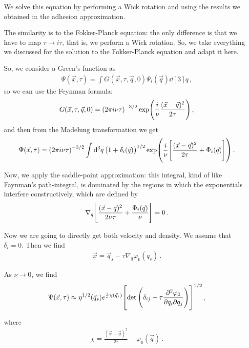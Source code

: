 \documentclass[main.tex]{subfiles}
\begin{document}
We solve this equation by performing a Wick rotation and using the results we obtained in the adhesion approximation. 

The similarity is to the Fokker-Planck equation: the only difference is that we have to map \(\tau \to i \tau \), that is, we perform a Wick rotation. 
So, we take everything we discussed for the solution to the Fokker-Planck equation and adapt it here. 

So, we consider a Green's function as 
%
\begin{align}
\Psi (\vec{x}, \tau ) = \int G(\vec{x}, \tau, \vec{q}, 0) \Psi_{i} (\vec{q}) \dd[3]{q}
\,,
\end{align}
%
so we can use the Feynman formula: 
%
\begin{align}
G(\vec{x}, \tau , \vec{q}, 0) = \qty(2 \pi i \nu \tau )^{-3/2} 
\exp( \frac{i}{\nu } \frac{(\vec{x} - \vec{q})^2}{2 \tau })
\,,
\end{align}
%
and then from the Madelung transformation we get 
%
\begin{align}
\Psi (\vec{x}, \tau ) = \qty(2 \pi i \nu \tau )^{ - 3/ 2}
\int \dd[3]{q} \qty(1 + \delta_{i} (\vec{q}))^{1/2} \exp( \frac{i}{\nu } \qty[ \frac{(\vec{x} - \vec{q})^{2}}{2 \tau } + \Phi_{i} (\vec{q})])
\,.
\end{align}

Now, we apply the saddle-point approximation: this integral, kind of like Faynman's path-integral, is dominated by the regions in which the exponentials interfere constructively, which are defined by 
%
\begin{align}
\nabla_{q} \qty[ \frac{(\vec{x} - \vec{q})^2}{2 \nu \tau } + \frac{\Phi_{i} (\vec{q})}{\nu }] = 0
\,.
\end{align}

Now we are going to directly get both velocity and density. 
We assume that \(\delta_{i}=0\). Then we find 
%
\begin{align}
\vec{x} = \vec{q}_{s} - \tau \nabla_{q } \varphi_0 (q_{s})
\,.
\end{align}

As \(\nu \to 0\), we find 
%
\begin{align}
\Psi (\vec{x}, \tau ) \approx \eta^{1/2} (\vec{q}_{s}) e^{ \frac{i}{\nu } \chi (\vec{q}_{s})} \qty[\det \qty(\delta_{ij} - \tau \pdv[2]{\varphi_0 }{q_{i}}{q_{j}})]^{1/2}
\,,
\end{align}

where 
%
\begin{align}
\chi = \frac{(\vec{x} - \vec{q})^2}{2 \tau } - \varphi_0 (\vec{q})
\,.
\end{align}
\end{document}
